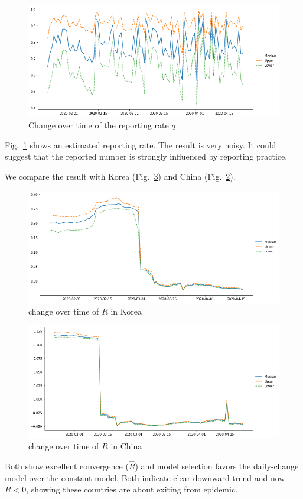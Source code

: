 \documentclass{amsart}
\begin{document}
\begin{figure}[h]
 \centering
 \includegraphics[width=\linewidth]{fig/q-Japan.png}
 \caption{Change over time of the reporting rate $q$}
 \label{fig:q}
\end{figure}

Fig.~\ref{fig:q} shows an estimated reporting rate.
The result is very noisy.
It could suggest that the reported number is strongly influenced by reporting practice.

We compare the result with Korea (Fig.~\ref{fig:b-China}) and China (Fig.~\ref{fig:b-Korea}).
\begin{figure}[h]
    \centering
    \includegraphics[width=\linewidth]{fig/beta-Korea.png}
    \caption{ change over time of $R$ in Korea}
    \label{fig:b-Korea}
\end{figure}
\begin{figure}[h]
    \centering
    \includegraphics[width=\linewidth]{fig/beta-China.png}
    \caption{ change over time of $R$ in China}
    \label{fig:b-China}
\end{figure}
Both show excellent convergence ($\hat{R}$) and model selection favors the daily-change model over the constant model.
Both indicate clear downward trend and now $R < 0$, showing these countries are about exiting from epidemic.
\end{document}
